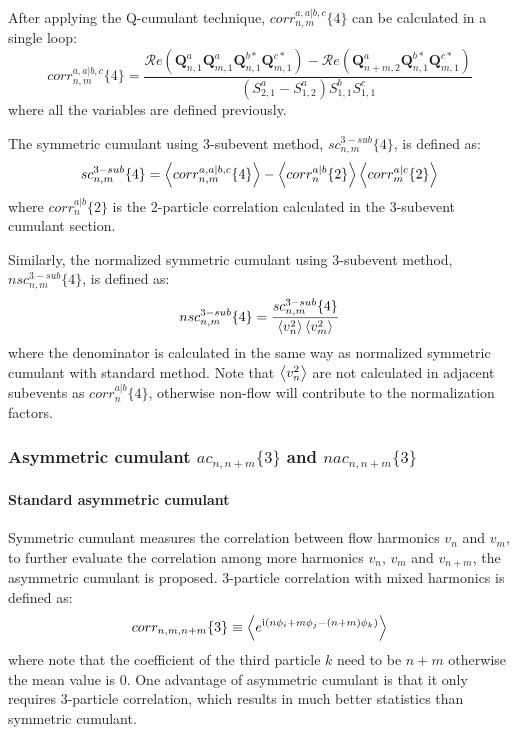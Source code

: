 After applying the Q-cumulant technique, $corr_{n,m}^{a,a|b,c}\{4\}$ can be calculated in a single loop:
\begin{equation}
corr_{n,m}^{a,a|b,c}\{4\} = \frac{\mathcal{R}\textit{e}(\pmb{Q}_{n,1}^a\pmb{Q}_{m,1}^a\pmb{Q}_{n,1}^{b*}\pmb{Q}_{m,1}^{c*})-\mathcal{R}\textit{e}(\pmb{Q}_{n+m,2}^a\pmb{Q}_{n,1}^{b*}\pmb{Q}_{m,1}^{c*})}{(S_{2,1}^a-S_{1,2}^{a})S_{1,1}^b S_{1,1}^c}
\end{equation}
where all the variables are defined previously.

The symmetric cumulant using 3-subevent method, $sc_{n,m}^{3-sub}\{4\}$, is defined as:
\begin{equation}
sc_{n,m}^{3-sub}\{4\} = \left\langle corr_{n,m}^{a,a|b,c}\{4\}\right\rangle - \left\langle corr_n^{a|b}\{2\}\right\rangle\left\langle corr_m^{a|c}\{2\}\right\rangle
\end{equation}
where $corr_n^{a|b}\{2\}$ is the 2-particle correlation calculated in the 3-subevent cumulant section.

Similarly, the normalized symmetric cumulant using 3-subevent method, $nsc_{n,m}^{3-sub}\{4\}$, is defined as:
\begin{equation}
nsc_{n,m}^{3-sub}\{4\} = \frac{sc_{n,m}^{3-sub}\{4\}}{\left\langle v_n^2\right\rangle\left\langle v_m^2\right\rangle}
\end{equation}
where the denominator is calculated in the same way as normalized symmetric cumulant with standard method. Note that $\left\langle v_n^2\right\rangle$ are not calculated in adjacent subevents as $corr_n^{a|b}\{4\}$, otherwise non-flow will contribute to the normalization factors.



\subsubsection{Asymmetric cumulant $ac_{n,n+m}\{3\}$ and $nac_{n,n+m}\{3\}$}
\paragraph{Standard asymmetric cumulant}
Symmetric cumulant measures the correlation between flow harmonics $v_n$ and $v_m$, to further evaluate the correlation among more harmonics $v_n$, $v_m$ and $v_{n+m}$, the asymmetric cumulant is proposed. 3-particle correlation with mixed harmonics is defined as:
\begin{equation}
corr_{n,m,n+m}\{3\}\equiv\left\langle e^{\text{i}(n\phi_i+m\phi_j-(n+m)\phi_k)}\right\rangle
\end{equation}
where note that the coefficient of the third particle $k$ need to be $n+m$ otherwise the mean value is 0. One advantage of asymmetric cumulant is that it only requires 3-particle correlation, which results in much better statistics than symmetric cumulant.

